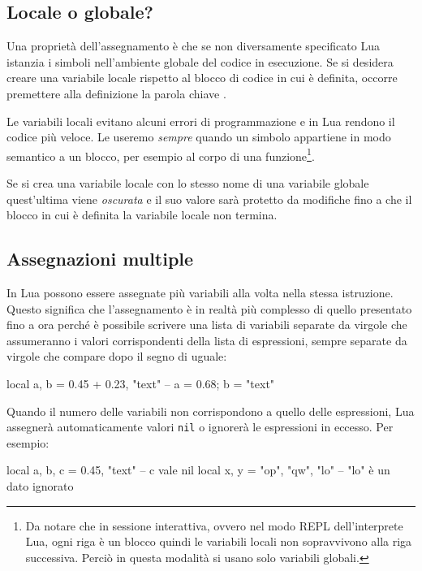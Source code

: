 \subsection{Locale o globale?}
\label{secFondLocaleGlobale}

Una proprietà dell'assegnamento è che se non diversamente specificato Lua
istanzia i simboli nell'ambiente globale del codice in esecuzione. Se si
desidera creare una variabile locale rispetto al blocco di codice in cui è
definita, occorre premettere alla definizione la parola chiave .

Le variabili locali evitano alcuni errori di programmazione e in Lua rendono il
codice più veloce. Le useremo \emph{sempre} quando un simbolo appartiene in modo
semantico a un blocco, per esempio al corpo di una funzione\footnote{Da notare
che in sessione interattiva, ovvero nel modo REPL dell'interprete Lua, ogni riga
è un blocco quindi le variabili locali non sopravvivono alla riga successiva.
Perciò in questa modalità si usano solo variabili globali.}.

Se si crea una variabile locale con lo stesso nome di una variabile globale
quest'ultima viene \emph{oscurata} e il suo valore sarà protetto da modifiche
fino a che il blocco in cui è definita la variabile locale non termina.


\subsection{Assegnazioni multiple}

In Lua possono essere assegnate più variabili alla volta nella stessa
istruzione. Questo significa che l'assegnamento è in realtà più complesso di
quello presentato fino a ora perché è possibile scrivere una lista di variabili
separate da virgole che assumeranno i valori corrispondenti della lista di
espressioni, sempre separate da virgole che compare dopo il segno di uguale:
\begin{lines}
local a, b = 0.45 + 0.23, "text" -- a = 0.68; b = "text"
\end{lines}

Quando il numero delle variabili non corrispondono a quello delle espressioni,
Lua assegnerà automaticamente valori \texttt{nil} o ignorerà le espressioni in
eccesso. Per esempio:
\begin{lines}
local a, b, c = 0.45, "text"  -- c vale nil
local x, y = "op", "qw", "lo" -- "lo" è un dato ignorato
\end{lines}

